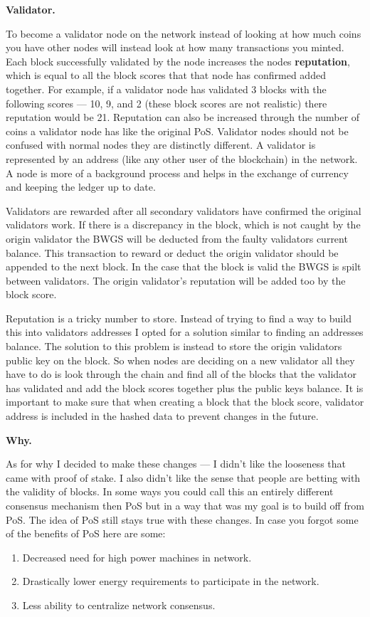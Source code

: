 \documentclass[
]{article}
\begin{document}
\textbf{Validator.}

To become a validator node on the network instead of looking at how much
coins you have other nodes will instead look at how many transactions
you minted. Each block successfully validated by the node increases the
nodes \textbf{reputation}, which is equal to all the block scores that
that node has confirmed added together. For example, if a validator node
has validated 3 blocks with the following scores --- 10, 9, and 2 (these
block scores are not realistic) there reputation would be 21. Reputation
can also be increased through the number of coins a validator node has
like the original PoS. Validator nodes should not be confused with
normal nodes they are distinctly different. A validator is represented
by an address (like any other user of the blockchain) in the network. A
node is more of a background process and helps in the exchange of
currency and keeping the ledger up to date.

Validators are rewarded after all secondary validators have confirmed
the original validators work. If there is a discrepancy in the block,
which is not caught by the origin validator the BWGS will be deducted
from the faulty validators current balance. This transaction to reward
or deduct the origin validator should be appended to the next block. In
the case that the block is valid the BWGS is spilt between validators.
The origin validator's reputation will be added too by the block score.

Reputation is a tricky number to store. Instead of trying to find a way
to build this into validators addresses I opted for a solution similar
to finding an addresses balance. The solution to this problem is instead
to store the origin validators public key on the block. So when nodes
are deciding on a new validator all they have to do is look through the
chain and find all of the blocks that the validator has validated and
add the block scores together plus the public keys balance. It is
important to make sure that when creating a block that the block score,
validator address is included in the hashed data to prevent changes in
the future.

\textbf{Why.}

As for why I decided to make these changes --- I didn't like the
looseness that came with proof of stake. I also didn't like the sense
that people are betting with the validity of blocks. In some ways you
could call this an entirely different consensus mechanism then PoS but
in a way that was my goal is to build off from PoS. The idea of PoS
still stays true with these changes. In case you forgot some of the
benefits of PoS here are some:

\begin{enumerate}
\def\labelenumi{\arabic{enumi}.}
\item
  Decreased need for high power machines in network.
\item
  Drastically lower energy requirements to participate in the network.
\item
  Less ability to centralize network consensus.
\end{enumerate}
\end{document}
